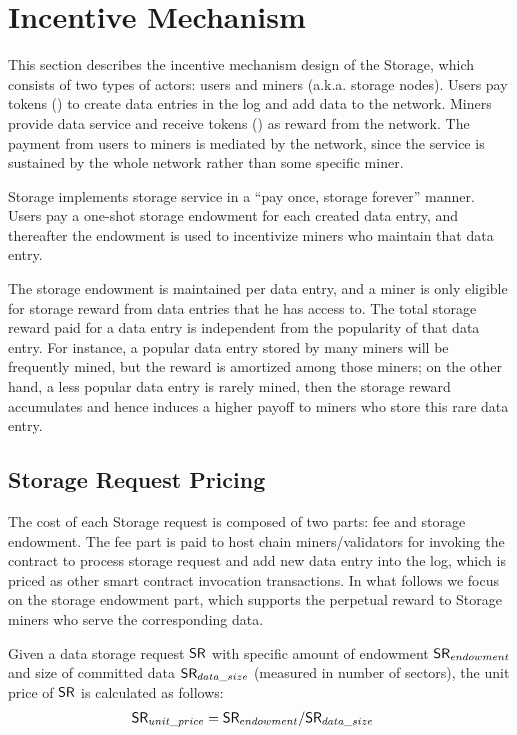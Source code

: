 
\section{Incentive Mechanism}

This section describes the incentive mechanism design of the \projabbrev Storage, which consists of two types of actors: users and miners (a.k.a. storage nodes).
Users pay tokens (\token) to create data entries in the log and add data to the network.
Miners provide data service and receive tokens (\token) as reward from the network.
The payment from users to miners is mediated by the \project network,
since the service is sustained by the whole network rather than some specific miner.

\projabbrev Storage implements storage service in a ``pay once, storage forever'' manner.
Users pay a one-shot storage endowment for each created data entry, and thereafter the endowment is used to incentivize miners who maintain that data entry.


The storage endowment is maintained per data entry,
and a miner is only eligible for storage reward from data entries that he has access to.
The total storage reward paid for a data entry is independent from the popularity of that data entry.
For instance, a popular data entry stored by many miners will be frequently mined, but the reward is amortized among those miners;
on the other hand, a less popular data entry is rarely mined, 
then the storage reward accumulates and hence induces a higher payoff to miners who store this rare data entry.



\subsection{Storage Request Pricing}

The cost of each \projabbrev Storage request is composed of two parts: fee and storage endowment.
The fee part is paid to host chain miners/validators for invoking the \project contract to process storage request and add new data entry into the log, which is priced as other smart contract invocation transactions.
In what follows we focus on the storage endowment part, 
which supports the perpetual reward to \projabbrev Storage miners who serve the corresponding data.

Given a data storage request $\mathsf{SR}$ with specific amount of endowment $\mathsf{SR}_{endowment}$ and size of committed data $\mathsf{SR}_{data\_size}$ (measured in number of \sectorsize sectors),
the unit price of $\mathsf{SR}$ is calculated as follows:
\begin{align}
	\mathsf{SR}_{unit\_price} &= \mathsf{SR}_{endowment}/\mathsf{SR}_{data\_size}
\end{align}

